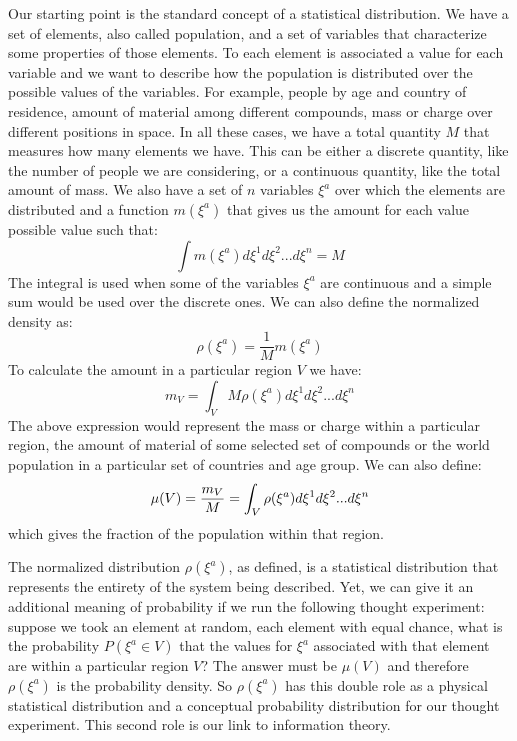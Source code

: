 \documentclass[11pt]{article}
\begin{document}
Our starting point is the standard concept of a statistical distribution. We have a set of elements, also called population, and a set of variables that characterize some properties of those elements. To each element is associated a value for each variable and we want to describe how the population is distributed over the possible values of the variables. For example, people by age and country of residence, amount of material among different compounds, mass or charge over different positions in space. In all these cases, we have a total quantity $M$ that measures how many elements we have. This can be either a discrete quantity, like the number of people we are considering, or a continuous quantity, like the total amount of mass. We also have a set of $n$ variables $\xi^a$ over which the elements are distributed and a function $m(\xi^a)$ that gives us the amount for each value possible value such that:
\begin{equation}
\int m(\xi^a) d\xi^1 d\xi^2 ... d\xi^n = M
\end{equation}
The integral is used when some of the variables $\xi^a$ are continuous and a simple sum would be used over the discrete ones. We can also define the normalized density as:
\begin{equation}
\rho(\xi^a) = \frac{1}{M}m(\xi^a)
\end{equation}
To calculate the amount in a particular region $V$ we have:
\begin{equation}
m_V = \int_V M \rho(\xi^a) d\xi^1 d\xi^2 ... d\xi^n
\end{equation}
The above expression would represent the mass or charge within a particular region, the amount of material of some selected set of compounds or the world population in a particular set of countries and age group. We can also define:
\begin{equation}
\mu(V) =\frac{m_V}{M} = \int_V \rho(\xi^a) d\xi^1 d\xi^2 ... d\xi^n \\
\end{equation}
which gives the fraction of the population within that region.

The normalized distribution $\rho(\xi^a)$, as defined, is a statistical distribution that represents the entirety of the system being described. Yet, we can give it an additional meaning of probability if we run the following thought experiment: suppose we took an element at random, each element with equal chance, what is the probability $P(\xi^a \in V)$ that the values for $\xi^a$ associated with that element are within a particular region $V$? The answer must be $\mu(V)$ and therefore $\rho(\xi^a)$ is the probability density. So $\rho(\xi^a)$ has this double role as a physical statistical distribution and a conceptual probability distribution for our thought experiment. This second role is our link to information theory.
\end{document}
